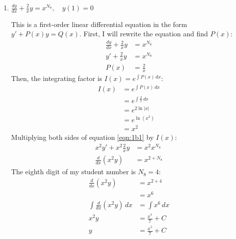 \documentclass[11pt]{article}
\begin{document}
\begin{enumerate}[label={\textbf{\arabic*.}}]
{\begin{enumerate}[label={\textbf{(\alph*)}}]
{\begin{align*}
                        &=e^{\sin(x)+9}
                    \end{align*}
                }
                \pagebreak
                \item{
                    \textbf{\boldmath $\frac{dy}{dx}+\frac{2}{x}y=x^{N_8},\quad y(1)=0$}
                    \par
                    This is a first-order linear differential equation in the form $y'+P(x)y=Q(x)$. First, I will rewrite the equation and find $P(x)$:
                    \begin{align}
                        \frac{dy}{dx}+\frac{2}{x}y&=x^{N_8} \nonumber \\
                        y'+\frac{2}{x}y&=x^{N_8} \label{eqn:1b1} \\
                        P(x)&=\frac{2}{x} \nonumber
                    \end{align}
                    Then, the integrating factor is $I(x)=e^{\int P(x)\,dx}$:
                    \begin{align*}
                        I(x)&=e^{\int P(x)\,dx} \\
                        &=e^{\int\frac{2}{x}\,dx} \\
                        &=e^{2\ln|x|} \\
                        &=e^{\ln(x^2)} \\
                        &=x^2
                    \end{align*}
                    Multiplying both sides of equation \ref{eqn:1b1} by $I(x)$:
                    \begin{align*}
                        x^2y'+x^2\frac{2}{x}y&=x^2x^{N_8} \\
                        \frac{d}{dx}(x^2y)&=x^{2+N_8}
                    \end{align*}
                    The eighth digit of my student number is $N_8=4$:
                    \begin{align}
                        \frac{d}{dx}(x^2y)&=x^{2+4} \nonumber \\
                        &=x^6 \nonumber \\
                        \int\frac{d}{dx}(x^2y)\,dx&=\int x^{6}\,dx \nonumber \\
                        x^2y&=\frac{x^7}{7}+C \nonumber \\
                        y&=\frac{x^5}{7}+C \label{eqn:1b2}
                    \end{align}
}
\end{enumerate}}
\end{enumerate}
\end{document}
